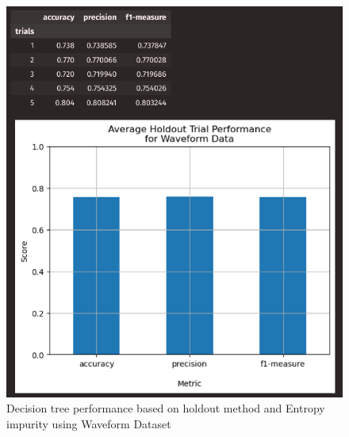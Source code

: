 \documentclass{article}
\begin{document}
\begin{figure}[H]
\begin{minipage}[t]{0.47\textwidth}
            \includegraphics[width=\textwidth, height=0.35\textheight]{2hw.png}
            \caption{Decision tree performance based on holdout method and Entropy impurity using Waveform Dataset}
        \end{minipage}
        
    \end{figure}
\end{document}
